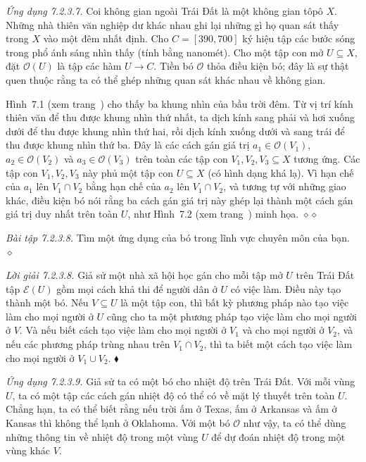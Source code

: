 \noindent\textit{Ứng dụng 7.2.3.7.}\keepwithnext
Coi không gian ngoài Trái Đất là một không gian tôpô $X$. Những nhà thiên văn nghiệp dư khác nhau ghi lại những gì họ quan sát thấy trong $X$ vào một đêm nhất định. Cho $C=[390,700]$ ký hiệu tập các bước sóng trong phổ ánh sáng nhìn thấy (tính bằng nanomét). Cho một tập con mở $U\subseteq X$, đặt $\mathcal O(U)$ là tập các hàm $U\to C$. Tiền bó $\mathcal O$ thỏa điều kiện bó; đây là sự thật quen thuộc rằng ta có thể ghép những quan sát khác nhau về không gian.

Hình~7.1 (xem trang~\pageref{fig:ctseven-sky-views}) cho thấy ba khung nhìn của bầu trời đêm. Từ vị trí kính thiên văn để thu được khung nhìn thứ nhất, ta dịch kính sang phải và hơi xuống dưới để thu được khung nhìn thứ hai, rồi dịch kính xuống dưới và sang trái để thu được khung nhìn thứ ba. Đây là các cách gán giá trị $a_1\in\mathcal O(V_1)$, $a_2\in\mathcal O(V_2)$ và $a_3\in\mathcal O(V_3)$ trên toàn các tập con $V_1,V_2,V_3\subseteq X$ tương ứng. Các tập con $V_1,V_2,V_3$ này phủ một tập con $U\subseteq X$ (có hình dạng khá lạ). Vì hạn chế của $a_1$ lên $V_1\cap V_2$ bằng hạn chế của $a_2$ lên $V_1\cap V_2$, và tương tự với những giao khác, điều kiện bó nói rằng ba cách gán giá trị này ghép lại thành một cách gán giá trị duy nhất trên toàn $U$, như Hình~7.2 (xem trang~\pageref{fig:ctseven-sky-glued}) minh họa.
\hfill$\diamond\diamond$

\noindent\textit{Bài tập 7.2.3.8.}\keepwithnext
Tìm một ứng dụng của bó trong lĩnh vực chuyên môn của bạn.
\hfill$\diamond$

\noindent\textit{Lời giải 7.2.3.8.}\keepwithnext
Giả sử một nhà xã hội học gán cho mỗi tập mở $U$ trên Trái Đất tập $\mathcal E(U)$ gồm mọi cách khả thi để người dân ở $U$ có việc làm. Điều này tạo thành một bó. Nếu $V\subseteq U$ là một tập con, thì bất kỳ phương pháp nào tạo việc làm cho mọi người ở $U$ cũng cho ta một phương pháp tạo việc làm cho mọi người ở $V$. Và nếu biết cách tạo việc làm cho mọi người ở $V_1$ và cho mọi người ở $V_2$, và nếu các phương pháp trùng nhau trên $V_1\cap V_2$, thì ta biết một cách tạo việc làm cho mọi người ở $V_1\cup V_2$.
\hfill$\blacklozenge$

\noindent\textit{Ứng dụng 7.2.3.9.}\keepwithnext
Giả sử ta có một bó cho nhiệt độ trên Trái Đất. Với mỗi vùng $U$, ta có một tập các cách gán nhiệt độ có thể có về mặt lý thuyết trên toàn $U$. Chẳng hạn, ta có thể biết rằng nếu trời ấm ở Texas, ấm ở Arkansas và ấm ở Kansas thì không thể lạnh ở Oklahoma. Với một bó $\mathcal O$ như vậy, ta có thể dùng
những thông tin về nhiệt độ trong một vùng $U$ để dự đoán nhiệt độ trong một vùng khác $V$.

